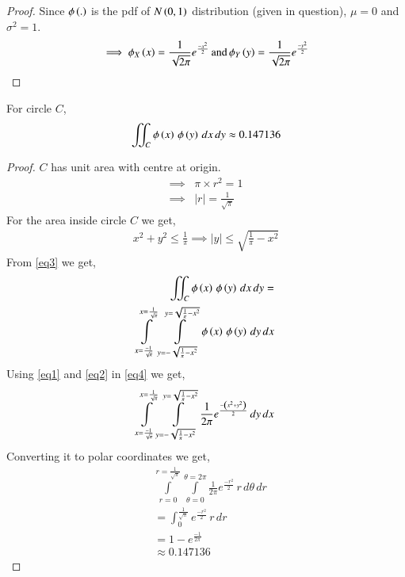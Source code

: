 \documentclass[journal,12pt,twocolumn]{IEEEtran}
\begin{document}
\begin{proof}
Since $\phi\left(.\right)$ is the pdf of $N\left(0,1\right)$ distribution (given in question),
$\mu = 0$ and $\sigma^2 = 1$.
\begin{align*}
    \implies \phi_X\left(x\right) = \frac{1}{\sqrt{2\pi}}e^\frac{-x^2}{2}\,\text{and}\,
    \phi_Y\left(y\right) = \frac{1}{\sqrt{2\pi}}e^\frac{-y^2}{2}
\end{align*}
\end{proof}

\begin{lemma}
For circle $C$,
\begin{align}
    \iint_C{\phi\left(x\right)\,\phi\left(y\right)\,dx\,dy}  \approx 0.147136 \label{eq9}
\end{align}
\end{lemma}

\begin{proof}
$C$ has unit area with centre at origin.
\begin{align}
    \implies &\pi\times r^2=1\\
    \implies &|r| = \frac{1}{\sqrt{\pi}}
\end{align}
For the area inside circle $C$ we get,
\begin{align}
    x^2+y^2\leq \frac{1}{\pi}
    \implies |y| \leq \sqrt{\frac{1}{\pi}-x^2}\label{eq3}
\end{align}
From \eqref{eq3} we get,
\begin{align}
    \iint_C{\phi\left(x\right)\,\phi\left(y\right)\,dx\,dy} = \nonumber\\
    \int\limits_{x=\frac{-1}{\sqrt{\pi}}}^{x=\frac{1}{\sqrt{\pi}}}\, \int\limits_{y=-\sqrt{\frac{1}{\pi}-x^2}}^{y=\sqrt{\frac{1}{\pi}-x^2}} \phi\left(x\right)\,\phi\left(y\right)\,dy\,dx \label{eq4}
\end{align}
Using \eqref{eq1} and \eqref{eq2} in \eqref{eq4} we get,
\begin{align}
    \int\limits_{x=\frac{-1}{\sqrt{\pi}}}^{x=\frac{1}{\sqrt{\pi}}} \int\limits_{y=-\sqrt{\frac{1}{\pi}-x^2}}^{y=\sqrt{\frac{1}{\pi}-x^2}} \frac{1}{2\pi}e^\frac{-\left(x^2+y^2\right)}{2}\,dy\,dx
\end{align}
Converting it to polar coordinates we get,
\begin{align}
    &\int\limits_{r=0}^{r=\frac{1}{\sqrt{\pi}}} \int\limits_{\theta=0}^{\theta=2\pi} \frac{1}{2\pi}e^\frac{-r^2}{2}\,r\,d\theta\,dr\\
    &= \int_{0}^{\frac{1}{\sqrt{\pi}}}e^\frac{-r^2}{2}\,r\,dr\\
    &= 1 - e^{\frac{-1}{2\pi}}\\
    &\approx 0.147136
\end{align}
\end{proof}
\end{document}
